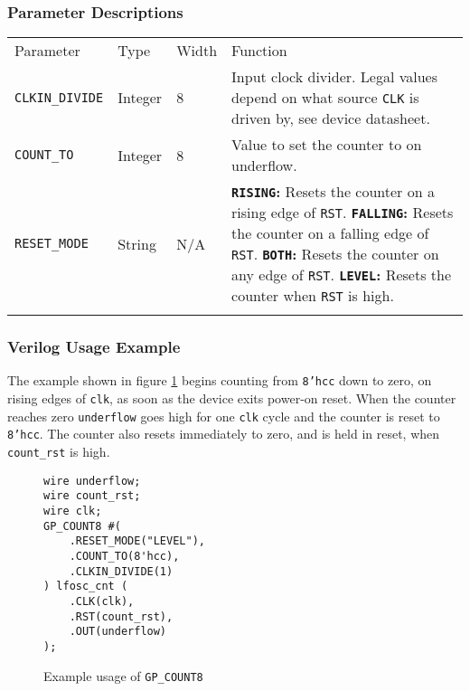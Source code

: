\documentclass[11pt]{article}
\newcommand{\tokenstyle}[1]{\texttt{#1}}
\newcommand{\wirestyle}[1]{\texttt{#1}}
\newcommand{\valuestyle}[1]{\texttt{#1}}
\newcommand{\strvaluestyle}[1]{\valuestyle{\textquotedbl#1\textquotedbl}}
\newcommand{\strexamplestyle}[1]{\textbf{\strvaluestyle{#1}:}}
\newcommand{\datastyle}[1]{\texttt{#1}}
\newcommand{\whenstyle}[1]{{\fontseries{sb}\selectfont#1}}
\newcommand{\thinhline}{\Xhline{1\arrayrulewidth}}
\newcommand{\thickhline}{\Xhline{2.5\arrayrulewidth}}
\begin{document}
\subsubsection{Parameter Descriptions}

\begin{tabularx}{\textwidth}{lllX}
\thinhline
\whenstyle{Parameter} & \whenstyle{Type} & \whenstyle{Width} & \whenstyle{Function} \\
\thickhline
\tokenstyle{CLKIN\_DIVIDE} & Integer & 8 &
	Input clock divider. Legal values depend on what source \tokenstyle{CLK} is driven by, see device datasheet.\\
\thinhline
\tokenstyle{COUNT\_TO} & Integer & 8 & Value to set the counter to on underflow. \\
\thinhline
\tokenstyle{RESET\_MODE} & String & N/A &
	\strexamplestyle{RISING} Resets the counter on a rising edge of \tokenstyle{RST}. \newline
	\strexamplestyle{FALLING} Resets the counter on a falling edge of \tokenstyle{RST}. \newline
	\strexamplestyle{BOTH} Resets the counter on any edge of \tokenstyle{RST}. \newline
	\strexamplestyle{LEVEL} Resets the counter when \tokenstyle{RST} is high. \\
\thinhline
\end{tabularx}

\subsubsection{Verilog Usage Example}

The example shown in figure \ref{gp-count8-example} begins counting from \datastyle{8'hcc} down to zero,
on rising edges of \wirestyle{clk}, as soon as the device exits power-on reset. When the counter reaches zero 
\wirestyle{underflow} goes high for one \wirestyle{clk} cycle and the counter is reset to \datastyle{8'hcc}. 
The counter also resets immediately to zero, and is held in reset, when \wirestyle{count\_rst} is high.

\begin{figure}[h]
\begin{lstlisting}
wire underflow;
wire count_rst;
wire clk;
GP_COUNT8 #(
	.RESET_MODE("LEVEL"),
	.COUNT_TO(8'hcc),
	.CLKIN_DIVIDE(1)
) lfosc_cnt (
	.CLK(clk),
	.RST(count_rst),
	.OUT(underflow)
);
\end{lstlisting}
\caption{Example usage of \tokenstyle{GP\_COUNT8}}
\label{gp-count8-example}
\end{figure}
\end{document}

